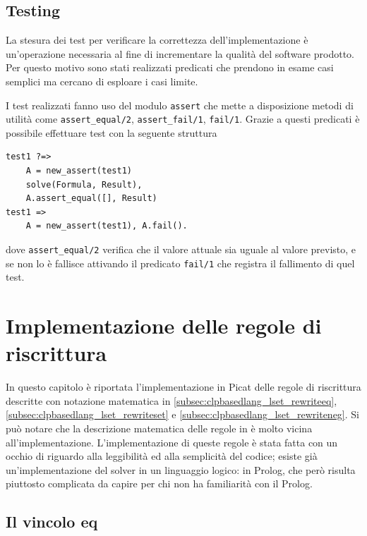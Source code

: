 \documentclass[12pt,a4paper,openright]{book}  %
\begin{document}
\section{Testing}
\label{sec:lsetpicat_testing}

La stesura dei test per verificare la correttezza dell'implementazione
è un’operazione necessaria al fine di incrementare la qualità del
software prodotto. Per questo motivo sono stati realizzati predicati
che prendono in esame casi semplici ma cercano di esploare i casi
limite.

I test realizzati fanno uso del modulo \verb|assert| che mette a
disposizione metodi di utilità come \verb|assert_equal/2|,
\verb|assert_fail/1|, \verb|fail/1|. Grazie a questi predicati è
possibile effettuare test con la seguente struttura
\begin{verbatim}
test1 ?=>
    A = new_assert(test1)
    solve(Formula, Result),
    A.assert_equal([], Result)
test1 =>
    A = new_assert(test1), A.fail().
\end{verbatim}
dove \verb|assert_equal/2| verifica che il valore attuale sia uguale
al valore previsto, e se non lo è fallisce attivando il predicato
\verb|fail/1| che registra il fallimento di quel test.



\chapter{Implementazione delle regole di riscrittura}
\label{ch:impl}


In questo capitolo è riportata l'implementazione in Picat delle regole
di riscrittura descritte con notazione matematica in
\ref{subsec:clpbasedlang_lset_rewriteeq},
\ref{subsec:clpbasedlang_lset_rewriteset} e
\ref{subsec:clpbasedlang_lset_rewriteneg}. Si può notare che la
descrizione matematica delle regole in \cite{Rossi18} è molto vicina
all’implementazione. L'implementazione di queste regole è stata fatta
con un occhio di riguardo alla leggibilità ed alla semplicità del
codice; esiste già un'implementazione del solver in un linguaggio
logico: \setlog{} in Prolog, che però risulta piuttosto complicata da
capire per chi non ha familiarità con il Prolog.

\section{Il vincolo eq}
\end{document}
